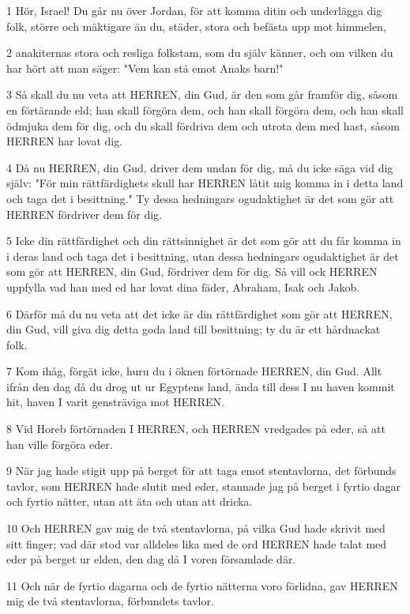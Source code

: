\par 1 Hör, Israel! Du går nu över Jordan, för att komma ditin och underlägga dig folk, större och mäktigare än du, städer, stora och befästa upp mot himmelen,
\par 2 anakiternas stora och resliga folkstam, som du själv känner, och om vilken du har hört att man säger: "Vem kan stå emot Anaks barn!"
\par 3 Så skall du nu veta att HERREN, din Gud, är den som går framför dig, såsom en förtärande eld; han skall förgöra dem, och han skall förgöra dem, och han skall ödmjuka dem för dig, och du skall fördriva dem och utrota dem med hast, såsom HERREN har lovat dig.
\par 4 Då nu HERREN, din Gud, driver dem undan för dig, må du icke säga vid dig själv: "För min rättfärdighets skull har HERREN låtit mig komma in i detta land och taga det i besittning." Ty dessa hedningars ogudaktighet är det som gör att HERREN fördriver dem för dig.
\par 5 Icke din rättfärdighet och din rättsinnighet är det som gör att du får komma in i deras land och taga det i besittning, utan dessa hedningars ogudaktighet är det som gör att HERREN, din Gud, fördriver dem för dig. Så vill ock HERREN uppfylla vad han med ed har lovat dina fäder, Abraham, Isak och Jakob.
\par 6 Därför må du nu veta att det icke är din rättfärdighet som gör att HERREN, din Gud, vill giva dig detta goda land till besittning; ty du är ett hårdnackat folk.
\par 7 Kom ihåg, förgät icke, huru du i öknen förtörnade HERREN, din Gud. Allt ifrån den dag då du drog ut ur Egyptens land, ända till dess I nu haven kommit hit, haven I varit gensträviga mot HERREN.
\par 8 Vid Horeb förtörnaden I HERREN, och HERREN vredgades på eder, så att han ville förgöra eder.
\par 9 När jag hade stigit upp på berget för att taga emot stentavlorna, det förbunds tavlor, som HERREN hade slutit med eder, stannade jag på berget i fyrtio dagar och fyrtio nätter, utan att äta och utan att dricka.
\par 10 Och HERREN gav mig de två stentavlorna, på vilka Gud hade skrivit med sitt finger; vad där stod var alldeles lika med de ord HERREN hade talat med eder på berget ur elden, den dag då I voren församlade där.
\par 11 Och när de fyrtio dagarna och de fyrtio nätterna voro förlidna, gav HERREN mig de två stentavlorna, förbundets tavlor.

